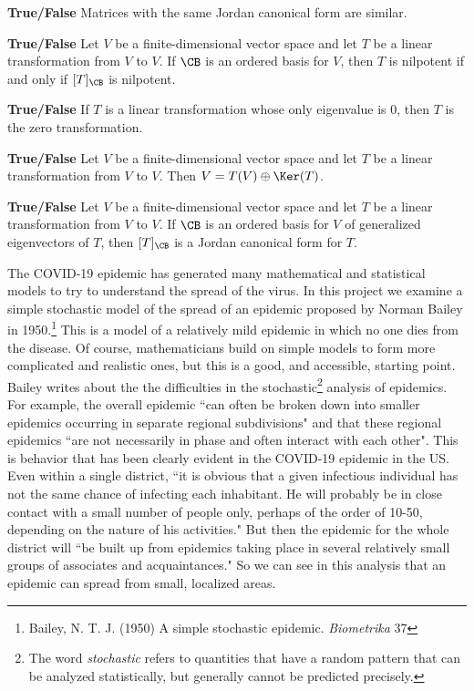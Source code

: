 	\item \textbf{True/False} Matrices with the same Jordan canonical form are similar.
	
	\item \textbf{True/False} Let $V$ be a finite-dimensional vector space and let $T$ be a linear transformation from $V$ to $V$. If $\CB$ is an ordered basis for $V$, then $T$ is nilpotent if and only if $[T]_{\CB}$ is nilpotent. 
	
	\item \textbf{True/False} If $T$ is a linear transformation whose only eigenvalue is 0, then $T$ is the zero transformation.
	
	\item \textbf{True/False} Let $V$ be a finite-dimensional vector space and let $T$ be a linear transformation from $V$ to $V$. Then $V = T(V) \oplus \Ker(T)$. 

	\item  \textbf{True/False} Let $V$ be a finite-dimensional vector space and let $T$ be a linear transformation from $V$ to $V$. If $\CB$ is an ordered basis for $V$ of generalized eigenvectors of $T$, then $[T]_{\CB}$ is a Jordan canonical form for $T$.
	
	 
	\ea
	
\ee
	

The COVID-19 epidemic has generated many mathematical and statistical models to try to understand the spread of the virus. In this project we examine a simple stochastic model of the spread of an epidemic proposed by Norman Bailey in 1950.\footnote{Bailey, N. T. J. (1950) A simple stochastic epidemic. \emph{Biometrika} 37} This is a model of a relatively mild epidemic in which no one dies from the disease. Of course, mathematicians build on simple models to form more complicated and realistic ones, but this is a good, and accessible, starting point. Bailey writes about the the difficulties in the stochastic\footnote{The word \emph{stochastic} refers to quantities that have a random pattern that can be analyzed statistically, but generally cannot be predicted precisely.} analysis of epidemics. For example, the overall epidemic ``can often be broken down into smaller epidemics occurring in separate regional subdivisions" and that these regional epidemics ``are not necessarily in phase and often interact with each other". This is behavior that has been clearly evident in the COVID-19 epidemic in the US. Even within a single district, ``it is obvious that a given infectious individual has not the same chance of infecting each inhabitant. He will probably be in close contact with a small number of people only, perhaps of the order of 10-50, depending on the nature of his activities." But then the  epidemic for the whole district will ``be built up from epidemics taking place in several relatively small groups of associates and acquaintances."  So we can see in this analysis that an epidemic can spread from small, localized areas. 

